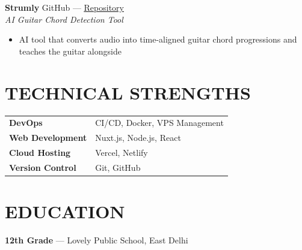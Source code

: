 \documentclass[11pt]{article}
\begin{document}
\vspace{6pt}

\textbf{Strumly} \hfill GitHub --- \href{#}{\underline{Repository}}\\
\textit{AI Guitar Chord Detection Tool}
\begin{itemize}
\item AI tool that converts audio into time-aligned guitar chord progressions and teaches the guitar alongside
\end{itemize}

\section*{TECHNICAL STRENGTHS}

\begin{tabular}{ll}
\textbf{DevOps} & CI/CD, Docker, VPS Management \\
\textbf{Web Development} & Nuxt.js, Node.js, React \\
\textbf{Cloud Hosting} & Vercel, Netlify \\
\textbf{Version Control} & Git, GitHub \\
\end{tabular}

\section*{EDUCATION}

\textbf{12th Grade} --- Lovely Public School, East Delhi
\end{document}
